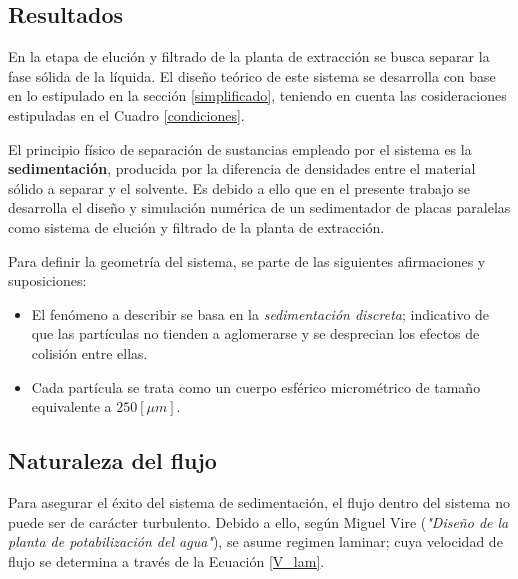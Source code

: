 \begin{center}
	\section{Resultados} \label{teorico:sed}
\end{center}

\noindent
\justify

En la etapa de eluci\'on y filtrado de la planta de extracci\'on se busca separar la fase s\'olida de la l\'iquida. El dise\~no te\'orico de este sistema se desarrolla con base en lo estipulado en la secci\'on \ref{simplificado}, teniendo en cuenta las cosideraciones estipuladas en el Cuadro \ref{condiciones}.


\noindent
\justify

El principio f\'isico de separaci\'on de sustancias empleado por el sistema es la \textbf{sedimentaci\'on}, producida por la diferencia de densidades entre el material s\'olido a separar y el solvente. Es debido a ello que en el presente trabajo se desarrolla el dise\~no y simulaci\'on num\'erica de un sedimentador de placas paralelas como sistema de eluci\'on y filtrado de la planta de extracci\'on.

\noindent
\justify

Para definir la geometr\'ia del sistema, se parte de las siguientes afirmaciones y suposiciones:

\begin{itemize}
	\item El fen\'omeno a describir se basa en la \textit{sedimentaci\'on discreta}; indicativo de que las part\'iculas no tienden a aglomerarse y se desprecian los efectos de colisi\'on entre ellas. 
	\item Cada part\'icula se trata como un cuerpo esf\'erico microm\'etrico de tama\~no equivalente a $250 [\mu m]$.
\end{itemize}


\subsection{Naturaleza del flujo}

\noindent
\justify

Para asegurar el \'exito del sistema de sedimentaci\'on, el flujo dentro del sistema no puede ser de car\'acter turbulento. Debido a ello, seg\'un Miguel Vire (\textit{"Dise\~no de la planta de potabilizaci\'on del agua"}), se asume regimen laminar; cuya velocidad de flujo se determina a trav\'es de la Ecuaci\'on \ref{V_lam}.


